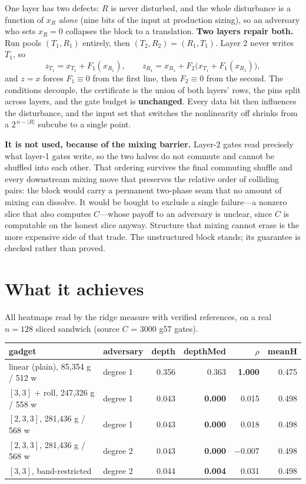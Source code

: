 \documentclass[11pt]{article}
\begin{document}
One layer has two defects: $R$ is never disturbed, and the whole disturbance is
a function of $x_R$ \emph{alone} (nine bits of the input at production sizing),
so an adversary who sets $x_R = 0$ collapses the block to a translation.
\textbf{Two layers repair both.} Run pools $(T_1,R_1)$ entirely, then
$(T_2,R_2)=(R_1,T_1)$. Layer 2 never writes $T_1$, so
\[
z_{T_1} = x_{T_1} + F_1(x_{R_1}), \qquad
z_{R_1} = x_{R_1} + F_2\bigl(x_{T_1} + F_1(x_{R_1})\bigr),
\]
and $z=x$ forces $F_1\equiv 0$ from the first line, then $F_2\equiv 0$ from the
second. The conditions decouple, the certificate is the union of both layers'
rows, the pins split across layers, and the gate budget is \textbf{unchanged}.
Every data bit then influences the disturbance, and the input set that switches
the nonlinearity off shrinks from a $2^{\,n-|R|}$ subcube to a single point.

\textbf{It is not used, because of the mixing barrier.} Layer-2 gates read
precisely what layer-1 gates write, so the two halves do not commute and cannot
be shuffled into each other. That ordering survives the final commuting shuffle
and every downstream mixing move that preserves the relative order of colliding
pairs: the block would carry a permanent two-phase seam that no amount of mixing
can dissolve. It would be bought to exclude a single failure---a nonzero slice
that also computes $C$---whose payoff to an adversary is unclear, since $C$ is
computable on the honest slice anyway. Structure that mixing cannot erase is the
more expensive side of that trade. The unstructured block stands; its guarantee
is checked rather than proved.

\section{What it achieves}

All heatmaps read by the ridge measure with verified references, on a real
$n{=}128$ sliced sandwich (source $C$ = 3000 g57 gates).

\begin{center}
\begin{tabular}{llrrrr}
\toprule
gadget & adversary & depth & depthMed & $\rho$ & meanH \\
\midrule
linear (plain), 85{,}354 g / 512 w & degree 1 & 0.356 & 0.363 & \textbf{1.000} & 0.475 \\
$[3,3]$ + roll, 247{,}326 g / 558 w & degree 1 & 0.043 & \textbf{0.000} & 0.015 & 0.498 \\
$[2,3,3]$, 281{,}436 g / 568 w & degree 1 & 0.043 & \textbf{0.000} & 0.018 & 0.498 \\
$[2,3,3]$, 281{,}436 g / 568 w & degree 2 & 0.043 & \textbf{0.000} & $-0.007$ & 0.498 \\
$[3,3]$, band-restricted & degree 2 & 0.044 & \textbf{0.004} & 0.031 & 0.498 \\
\bottomrule
\end{tabular}
\end{center}
\end{document}
